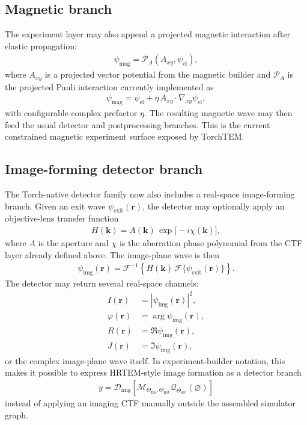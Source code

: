 \documentclass[11pt]{article}
\begin{document}
\subsection{Magnetic branch}
The experiment layer may also append a projected magnetic interaction after elastic
propagation:
\begin{align}
  \psi_{\mathrm{mag}}
  = \mathcal{P}_A\!\left(
    A_{xy},
    \psi_{\mathrm{el}}
  \right),
\end{align}
where $A_{xy}$ is a projected vector potential from the magnetic builder and
$\mathcal{P}_A$ is the projected Pauli interaction currently implemented as
\begin{align}
  \psi_{\mathrm{mag}}
  = \psi_{\mathrm{el}} + \eta \, A_{xy}\cdot\nabla_{xy}\psi_{\mathrm{el}},
\end{align}
with configurable complex prefactor $\eta$.  The resulting magnetic wave may then feed
the usual detector and postprocessing branches.  This is the current constrained
magnetic experiment surface exposed by TorchTEM.

\subsection{Image-forming detector branch}
The Torch-native detector family now also includes a real-space image-forming branch.
Given an exit wave $\psi_{\mathrm{exit}}(\mathbf{r})$, the detector may optionally
apply an objective-lens transfer function
\begin{align}
  H(\mathbf{k}) = A(\mathbf{k})\,\exp\!\bigl[-i\chi(\mathbf{k})\bigr],
\end{align}
where $A$ is the aperture and $\chi$ is the aberration phase polynomial from the CTF
layer already defined above.  The image-plane wave is then
\begin{align}
  \psi_{\mathrm{img}}(\mathbf{r})
  =
  \mathcal{F}^{-1}
  \left\{
    H(\mathbf{k})\,
    \mathcal{F}\{\psi_{\mathrm{exit}}(\mathbf{r})\}
  \right\}.
\end{align}
The detector may return several real-space channels:
\begin{align}
  I(\mathbf{r}) &= |\psi_{\mathrm{img}}(\mathbf{r})|^2, \\
  \varphi(\mathbf{r}) &= \arg \psi_{\mathrm{img}}(\mathbf{r}), \\
  R(\mathbf{r}) &= \Re \psi_{\mathrm{img}}(\mathbf{r}), \\
  J(\mathbf{r}) &= \Im \psi_{\mathrm{img}}(\mathbf{r}),
\end{align}
or the complex image-plane wave itself.  In experiment-builder notation, this makes it
possible to express HRTEM-style image formation as a detector branch
\begin{align}
  y = \mathcal{D}_{\mathrm{img}}
  \left[
    \mathcal{M}_{\Theta_{\mathrm{ms}},\Theta_{\mathrm{pot}}}
    \mathcal{Q}_{\Theta_{\mathrm{src}}}(\varnothing)
  \right]
\end{align}
instead of applying an imaging CTF manually outside the assembled simulator graph.
\end{document}
